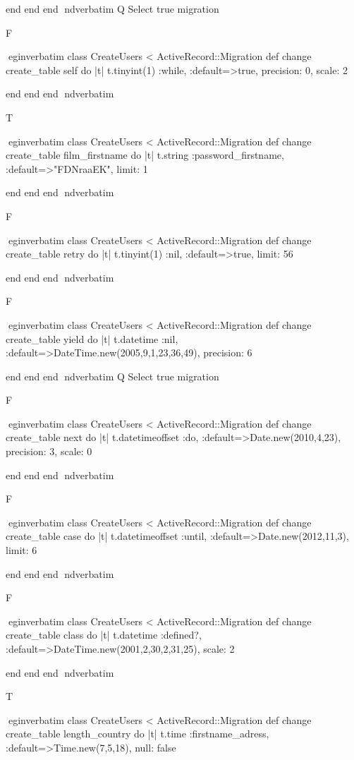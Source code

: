     end 
  end 
end
nd{verbatim}
Q
 Select true migration

F

egin{verbatim}
 class CreateUsers < ActiveRecord::Migration 
  def change 
    create_table self do |t| 
      t.tinyint(1) :while, :default=>true, precision: 0, scale: 2
    
    end 
  end 
end
nd{verbatim}

T

egin{verbatim}
 class CreateUsers < ActiveRecord::Migration 
  def change 
    create_table film_firstname do |t| 
      t.string :password_firstname, :default=>"FDNraaEK", limit: 1
    
    end 
  end 
end
nd{verbatim}

F

egin{verbatim}
 class CreateUsers < ActiveRecord::Migration 
  def change 
    create_table retry do |t| 
      t.tinyint(1) :nil, :default=>true, limit: 56
    
    end 
  end 
end
nd{verbatim}

F

egin{verbatim}
 class CreateUsers < ActiveRecord::Migration 
  def change 
    create_table yield do |t| 
      t.datetime :nil, :default=>DateTime.new(2005,9,1,23,36,49), precision: 6
    
    end 
  end 
end
nd{verbatim}
Q
 Select true migration

F

egin{verbatim}
 class CreateUsers < ActiveRecord::Migration 
  def change 
    create_table next do |t| 
      t.datetimeoffset :do, :default=>Date.new(2010,4,23), precision: 3, scale: 0
    
    end 
  end 
end
nd{verbatim}

F

egin{verbatim}
 class CreateUsers < ActiveRecord::Migration 
  def change 
    create_table case do |t| 
      t.datetimeoffset :until, :default=>Date.new(2012,11,3), limit: 6
    
    end 
  end 
end
nd{verbatim}

F

egin{verbatim}
 class CreateUsers < ActiveRecord::Migration 
  def change 
    create_table class do |t| 
      t.datetime :defined?, :default=>DateTime.new(2001,2,30,2,31,25), scale: 2
    
    end 
  end 
end
nd{verbatim}

T

egin{verbatim}
 class CreateUsers < ActiveRecord::Migration 
  def change 
    create_table length_country do |t| 
      t.time :firstname_adress, :default=>Time.new(7,5,18), null: false
    
